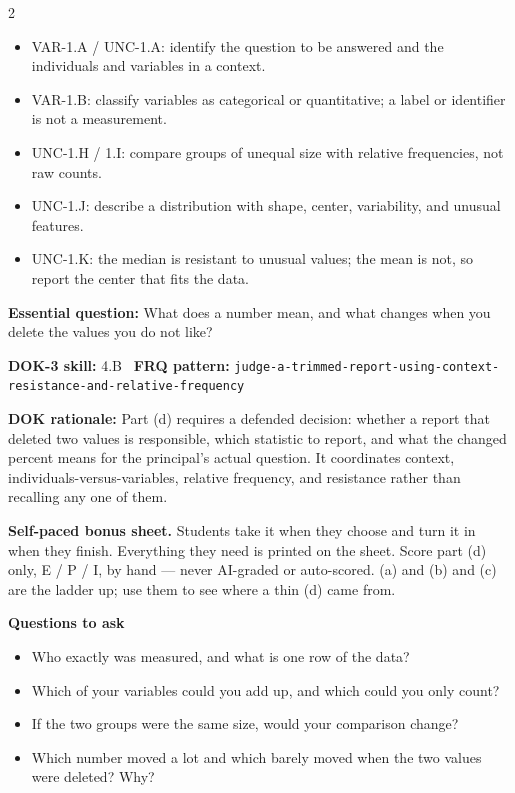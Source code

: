 \documentclass[11pt]{article}
\begin{document}

\begin{multicols}{2}
{\footnotesize\setlength{\parskip}{0pt}
\begin{itemize}[leftmargin=*,itemsep=0pt,topsep=0pt]
\item VAR-1.A / UNC-1.A: identify the question to be answered and the individuals and variables in a context.
\item VAR-1.B: classify variables as categorical or quantitative; a label or identifier is not a measurement.
\item UNC-1.H / 1.I: compare groups of unequal size with relative frequencies, not raw counts.
\item UNC-1.J: describe a distribution with shape, center, variability, and unusual features.
\item UNC-1.K: the median is resistant to unusual values; the mean is not, so report the center that fits the data.
\end{itemize}}
\end{multicols}
\clearpage
\small
\textbf{Essential question:} What does a number mean, and what changes when you delete the values you do not like?\par
\textbf{DOK-3 skill:} 4.B \textperiodcentered\ \textbf{FRQ pattern:} {\small\texttt{judge-\allowbreak{}a-\allowbreak{}trimmed-\allowbreak{}report-\allowbreak{}using-\allowbreak{}context-\allowbreak{}resistance-\allowbreak{}and-\allowbreak{}relative-\allowbreak{}frequency}}\par
\textbf{DOK rationale:} Part (d) requires a defended decision: whether a report that deleted two values is responsible, which statistic to report, and what the changed percent means for the principal's actual question. It coordinates context, individuals-versus-variables, relative frequency, and resistance rather than recalling any one of them.\par

\textbf{Self-paced bonus sheet.} Students take it when they choose and turn it in when they finish. Everything they need is printed on the sheet. Score part (d) only, E / P / I, by hand --- never AI-graded or auto-scored. (a) and (b) and (c) are the ladder up; use them to see where a thin (d) came from.\par

\textbf{Questions to ask}
\begin{itemize}[leftmargin=1.5em,itemsep=2pt,topsep=2pt]
  \item Who exactly was measured, and what is one row of the data?
  \item Which of your variables could you add up, and which could you only count?
  \item If the two groups were the same size, would your comparison change?
  \item Which number moved a lot and which barely moved when the two values were deleted? Why?
\end{itemize}
\end{document}
